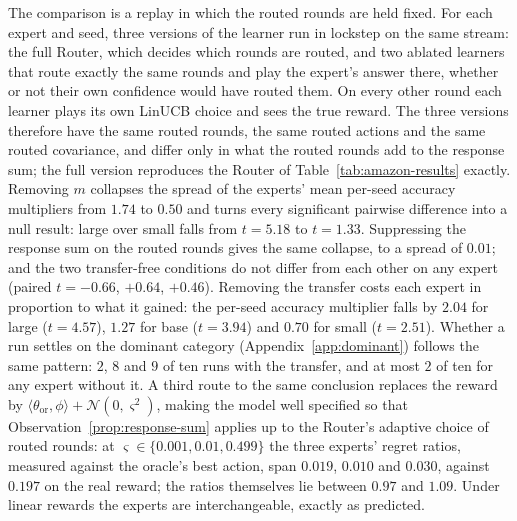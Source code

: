 \documentclass[anon]{alt2027} %
\begin{document}
The comparison is a replay in which the routed rounds are held fixed. For
each expert and seed, three versions of the learner run in lockstep on the
same stream: the full Router, which decides which rounds are routed, and two
ablated learners that route exactly the same rounds and play the expert's
answer there, whether or not their own confidence would have routed them. On
every other round each learner plays its own LinUCB choice and sees the true
reward. The three versions therefore have the same routed rounds, the same
routed actions and the same routed covariance, and differ only in what the
routed rounds add to the response sum; the full version reproduces the
Router of Table~\ref{tab:amazon-results} exactly. Removing $m$ collapses the
spread of the experts' mean per-seed accuracy multipliers from $1.74$ to $0.50$ and
turns every significant pairwise difference into a null result: large over
small falls from $t=5.18$ to $t=1.33$. Suppressing the response sum on the
routed rounds gives the same collapse, to a spread of $0.01$; and the two
transfer-free conditions do not differ from each other on any expert (paired
$t=-0.66$, $+0.64$, $+0.46$). Removing the transfer costs each expert in
proportion to what it gained: the per-seed accuracy multiplier falls by $2.04$ for
large ($t=4.57$), $1.27$ for base ($t=3.94$) and $0.70$ for small
($t=2.51$). Whether a run settles on the dominant category
(Appendix~\ref{app:dominant}) follows the same pattern: $2$, $8$ and $9$ of
ten runs with the transfer, and at most $2$ of ten for any expert without
it. A third route to the same conclusion
replaces the reward by $\langle\theta_{\mathrm{or}},\phi\rangle+\mathcal
N(0,\varsigma^2)$, making the model well specified so that
Observation~\ref{prop:response-sum} applies up to the Router's adaptive
choice of routed rounds: at
$\varsigma\in\{0.001,0.01,0.499\}$ the three experts' regret ratios, measured
against the oracle's best action, span $0.019$, $0.010$ and $0.030$, against
$0.197$ on the real reward; the ratios themselves lie between $0.97$ and
$1.09$. Under linear rewards the experts are interchangeable, exactly as
predicted.
\end{document}
